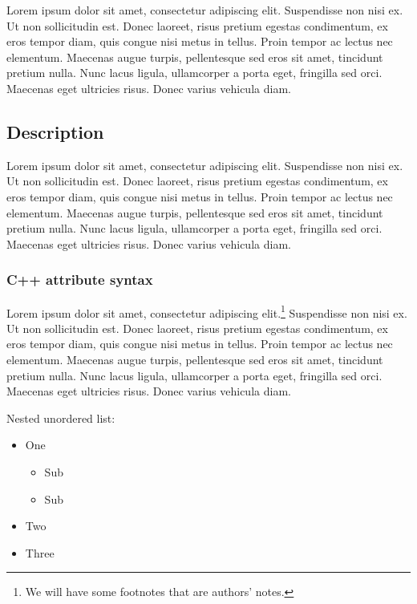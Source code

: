 

Lorem ipsum dolor sit amet, consectetur
adipiscing elit. Suspendisse non nisi ex. Ut non sollicitudin est. Donec
laoreet, risus pretium egestas condimentum, ex eros tempor diam, quis
congue nisi metus in tellus. Proin tempor ac lectus nec elementum.
Maecenas augue turpis, pellentesque sed eros sit amet, tincidunt pretium
nulla. Nunc lacus ligula, ullamcorper a porta eget, fringilla sed orci.
Maecenas eget ultricies risus. Donec varius vehicula diam.

\subsection[Description]{Description}\label{description}

Lorem ipsum dolor sit amet, consectetur
adipiscing elit. Suspendisse non nisi ex. Ut non sollicitudin est. Donec
laoreet, risus pretium egestas condimentum, ex eros tempor diam, quis
congue nisi metus in tellus. Proin tempor ac lectus nec elementum.
Maecenas augue turpis, pellentesque sed eros sit amet, tincidunt pretium
nulla. Nunc lacus ligula, ullamcorper a porta eget, fringilla sed orci.
Maecenas eget ultricies risus. Donec varius vehicula diam.

\subsubsection[C++ attribute syntax]{C++ attribute syntax}\label{c++-attribute-syntax}

Lorem ipsum dolor sit amet, consectetur
adipiscing elit.{\cprotect\footnote{\authorsnote We will have
some footnotes that are authors' notes.}} Suspendisse non nisi ex. Ut non sollicitudin est. Donec
laoreet, risus pretium egestas condimentum, ex eros tempor diam, quis
congue nisi metus in tellus. Proin tempor ac lectus nec elementum.
Maecenas augue turpis, pellentesque sed eros sit amet, tincidunt pretium
nulla. Nunc lacus ligula, ullamcorper a porta eget, fringilla sed orci.
Maecenas eget ultricies risus. Donec varius vehicula diam.

Nested unordered list:

\begin{itemize}
\item{One\begin{itemize}
\item{Sub}
\item{Sub}
\end{itemize}
}
\item{Two}
\item{Three}
\end{itemize}

